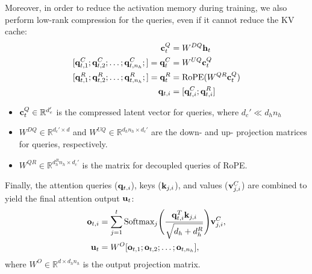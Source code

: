 
Moreover, in order to reduce the activation memory during training, we also perform low-rank compression for the queries, even if it cannot reduce the KV cache:
\begin{align*}
	\rvc_t^{Q} &= W^{DQ}\rvh_t\\
	[\rvq_{t,1}^C; \rvq_{t,2}^C; \dots ;\rvq_{t,n_h}^C;] = \rvq_t^{C} &= W^{UQ}\rvc_t^{Q}\\
	[\rvq_{t,1}^R; \rvq_{t,2}^R; \dots ;\rvq_{t,n_h}^R;] = \rvq_t^{R} &= \text{RoPE}(W^{QR}\rvc_t^Q)\\
	\rvq_{t,i} &= [\rvq_{t,i}^C;\rvq_{t,i}^{R}]
\end{align*}
\begin{itemize}
	\item ${\mathbf{c}}_t^{Q}\in \mathbb{R}^{d_c'}$ is the compressed latent vector for queries, where $d_c'\ll d_hn_h$
	\item $W^{DQ}\in \mathbb{R}^{d_c'\times d}$ and $W^{UQ}\in \mathbb{R}^{d_hn_h\times d_c'}$ are the down- and up- projection matrices for queries, respectively.
	\item $W^{QR}\in \mathbb{R}^{d_h^Rn_h\times d_c'}$ is the matrix for decoupled queries of RoPE.
\end{itemize}

Finally, the attention queries (${\mathbf{q}}_{t,i}$), keys (${\mathbf{k}}_{j,i}$), and values (${\mathbf{v}}_{j,i}^C$) are combined to yield the final attention output ${\mathbf{u}}_t$:
\begin{align*}
	{\mathbf{o}}_{t,i} &= \sum_{j=1}^t\text{Softmax}_j\Bigg( \frac{{\mathbf{q}}_{t,i}^T{\mathbf{k}}_{j,i}}{\sqrt{d_h+d_h^R}} \Bigg){\mathbf{v}}_{j,i}^C,\\
	{\mathbf{u}}_t &= W^O[{\mathbf{o}}_{t,1};{\mathbf{o}}_{t,2};\dots;{\mathbf{o}}_{t,n_h}],
\end{align*}
where $W^O\in \mathbb{R}^{d\times d_hn_h}$ is the output projection matrix.



